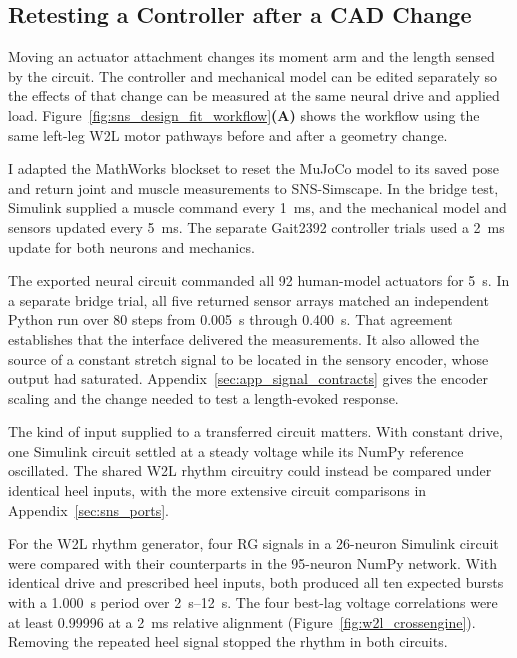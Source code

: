 \subsection{Retesting a Controller after a CAD Change}\label{sec:sns_bridge_methods}\label{sec:crossengine_results}

Moving an actuator attachment changes its moment arm and the length sensed by the circuit. The controller and mechanical model can be edited separately so the effects of that change can be measured at the same neural drive and applied load. Figure~\ref{fig:sns_design_fit_workflow}\textbf{(A)} shows the workflow using the same left-leg W2L motor pathways before and after a geometry change.

I adapted the MathWorks blockset to reset the MuJoCo model to its saved pose and return joint and muscle measurements to SNS-Simscape. In the bridge test, Simulink supplied a muscle command every \qty{1}{\milli\second}, and the mechanical model and sensors updated every \qty{5}{\milli\second}. The separate Gait2392 controller trials used a \qty{2}{\milli\second} update for both neurons and mechanics.

The exported neural circuit commanded all 92 human-model actuators for \qty{5}{\second}. In a separate bridge trial, all five returned sensor arrays matched an independent Python run over 80 steps from \qty{0.005}{\second} through \qty{0.400}{\second}. That agreement establishes that the interface delivered the measurements. It also allowed the source of a constant stretch signal to be located in the sensory encoder, whose output had saturated. Appendix~\ref{sec:app_signal_contracts} gives the encoder scaling and the change needed to test a length-evoked response.

The kind of input supplied to a transferred circuit matters. With constant drive, one Simulink circuit settled at a steady voltage while its NumPy reference oscillated. The shared W2L rhythm circuitry could instead be compared under identical heel inputs, with the more extensive circuit comparisons in Appendix~\ref{sec:sns_ports}.

For the W2L rhythm generator, four RG signals in a 26-neuron Simulink circuit were compared with their counterparts in the 95-neuron NumPy network. With identical drive and prescribed heel inputs, both produced all ten expected bursts with a \qty{1.000}{\second} period over \qtyrange{2}{12}{\second}. The four best-lag voltage correlations were at least 0.99996 at a \qty{2}{\milli\second} relative alignment (Figure~\ref{fig:w2l_crossengine}). Removing the repeated heel signal stopped the rhythm in both circuits.

